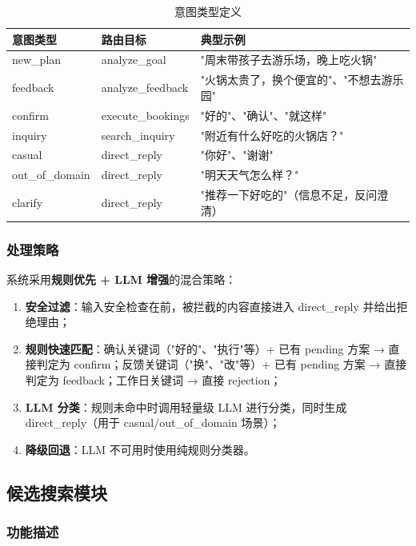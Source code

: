 \documentclass[12pt,a4paper]{ctexart}
\begin{document}
\begin{table}[ht]
\centering
\begin{tabular}{p{2.5cm}p{3cm}p{7cm}}
\toprule
\textbf{意图类型} & \textbf{路由目标} & \textbf{典型示例} \\
\midrule
new\_plan   & analyze\_goal & "周末带孩子去游乐场，晚上吃火锅" \\
feedback   & analyze\_feedback & "火锅太贵了，换个便宜的"、"不想去游乐园" \\
confirm    & execute\_bookings & "好的"、"确认"、"就这样" \\
inquiry    & search\_inquiry & "附近有什么好吃的火锅店？" \\
casual     & direct\_reply  & "你好"、"谢谢" \\
out\_of\_domain & direct\_reply & "明天天气怎么样？" \\
clarify    & direct\_reply  & "推荐一下好吃的"（信息不足，反问澄清） \\
\bottomrule
\end{tabular}
\caption{意图类型定义}
\label{tab:intent-types}
\end{table}

\subsubsection{处理策略}

系统采用\textbf{规则优先 + LLM 增强}的混合策略：

\begin{enumerate}[label=(\arabic*)]
  \item \textbf{安全过滤}：输入安全检查在前，被拦截的内容直接进入 direct\_reply 并给出拒绝理由；
  \item \textbf{规则快速匹配}：确认关键词（"好的"、"执行"等）+ 已有 pending 方案 → 直接判定为 confirm；反馈关键词（"换"、"改"等）+ 已有 pending 方案 → 直接判定为 feedback；工作日关键词 → 直接 rejection；
  \item \textbf{LLM 分类}：规则未命中时调用轻量级 LLM 进行分类，同时生成 direct\_reply（用于 casual/out\_of\_domain 场景）；
  \item \textbf{降级回退}：LLM 不可用时使用纯规则分类器。
\end{enumerate}

\subsection{候选搜索模块}

\subsubsection{功能描述}
\end{document}
